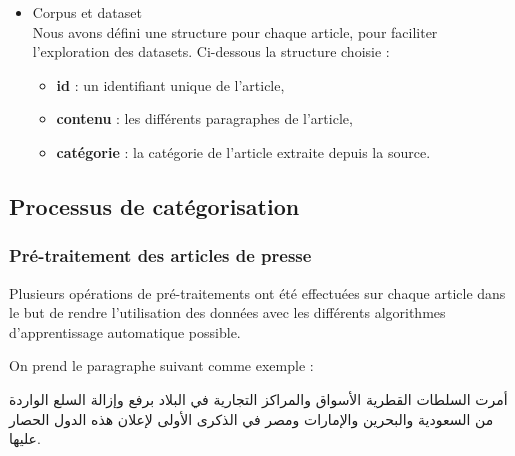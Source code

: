     \begin{itemize}[leftmargin=*, label={}]
        \item{Corpus et dataset}\\
            Nous avons défini une structure pour chaque article, pour faciliter l'exploration des datasets. Ci-dessous la structure choisie :
            \begin{itemize}
               \item{\textbf{id} : }un identifiant unique de l'article,
               \item{\textbf{contenu} : }les différents paragraphes de l'article,
               \item{\textbf{catégorie} : }la catégorie de l'article extraite depuis la source.
            \end{itemize}
    \end{itemize}

    \subsection{Processus de catégorisation}
        \subsubsection{Pré-traitement des articles de presse}\label{pretraitement}
        Plusieurs opérations de pré-traitements ont été effectuées sur chaque article dans le but de rendre l'utilisation des données avec les différents algorithmes d'apprentissage automatique possible.

        On prend le paragraphe suivant comme exemple :

            \begin{arab}أمرت السلطات القطرية الأسواق والمراكز التجارية في البلاد برفع وإزالة السلع الواردة من السعودية والبحرين والإمارات ومصر في الذكرى الأولى لإعلان هذه الدول الحصار عليها.\end{arab}
            
